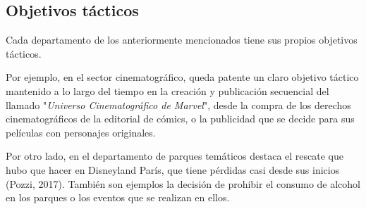 \subsection{Objetivos tácticos}
Cada departamento de los anteriormente mencionados tiene sus propios objetivos tácticos.

Por ejemplo, en el sector cinematográfico, queda patente un claro objetivo táctico mantenido a lo largo del tiempo en la creación y publicación secuencial del llamado "\textit{Universo Cinematográfico de Marvel}", desde la compra de los derechos cinematográficos de la editorial de cómics, o la publicidad que se decide para sus películas con personajes originales.

Por otro lado, en el departamento de parques temáticos destaca el rescate que hubo que hacer en Disneyland París, que tiene pérdidas casi desde sus inicios (Pozzi, 2017). También son ejemplos la decisión de prohibir el consumo de alcohol en los parques o los eventos que se realizan en ellos.
